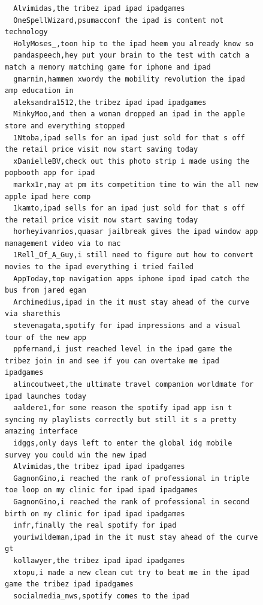 \begin{figure}[htpb]
\begin{verbatim}
  Alvimidas,the tribez ipad ipad ipadgames
  OneSpellWizard,psumacconf the ipad is content not technology
  HolyMoses_,toon hip to the ipad heem you already know so
  pandaspeech,hey put your brain to the test with catch a match a memory matching game for iphone and ipad
  gmarnin,hammen xwordy the mobility revolution the ipad amp education in
  aleksandra1512,the tribez ipad ipad ipadgames
  MinkyMoo,and then a woman dropped an ipad in the apple store and everything stopped
  1Ntoba,ipad sells for an ipad just sold for that s off the retail price visit now start saving today
  xDanielleBV,check out this photo strip i made using the popbooth app for ipad
  markx1r,may at pm its competition time to win the all new apple ipad here comp
  1kamto,ipad sells for an ipad just sold for that s off the retail price visit now start saving today
  horheyivanrios,quasar jailbreak gives the ipad window app management video via to mac
  1Rell_Of_A_Guy,i still need to figure out how to convert movies to the ipad everything i tried failed
  AppToday,top navigation apps iphone ipod ipad catch the bus from jared egan
  Archimedius,ipad in the it must stay ahead of the curve via sharethis
  stevenagata,spotify for ipad impressions and a visual tour of the new app
  ppfernand,i just reached level in the ipad game the tribez join in and see if you can overtake me ipad ipadgames
  alincoutweet,the ultimate travel companion worldmate for ipad launches today
  aaldere1,for some reason the spotify ipad app isn t syncing my playlists correctly but still it s a pretty amazing interface
  idggs,only days left to enter the global idg mobile survey you could win the new ipad
  Alvimidas,the tribez ipad ipad ipadgames
  GagnonGino,i reached the rank of professional in triple toe loop on my clinic for ipad ipad ipadgames
  GagnonGino,i reached the rank of professional in second birth on my clinic for ipad ipad ipadgames
  infr,finally the real spotify for ipad
  youriwildeman,ipad in the it must stay ahead of the curve gt
  kollawyer,the tribez ipad ipad ipadgames
  xtopu,i made a new clean cut try to beat me in the ipad game the tribez ipad ipadgames
  socialmedia_nws,spotify comes to the ipad


\end{verbatim}
\end{figure}
